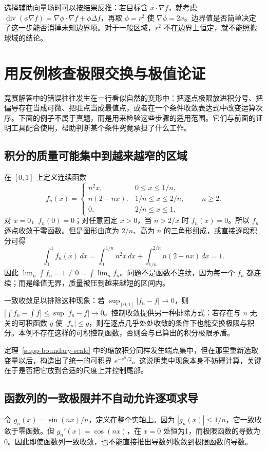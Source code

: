 \documentclass[UTF8,12pt,a4paper,fontset=fandol]{ctexart}
\begin{document}
选择辅助向量场时可以按结果反推：若目标含 $x\cdot\nabla f$，就考虑 $\operatorname{div}(\phi\nabla f)=\nabla\phi\cdot\nabla f+\phi\Delta f$，再取 $\phi=r^2$ 使 $\nabla\phi=2x$。边界值是否简单决定了这一步能否消掉未知边界项。对于一般区域，$r^2$ 不在边界上恒定，就不能照搬球域的结论。

\section{用反例核查极限交换与极值论证}\label{sec:supp-counterexamples}
竞赛解答中的错误往往发生在一行看似自然的变形中：把逐点极限放进积分号、把偏导存在当成可微、把驻点当成最值点，或者在一个条件收敛表达式中改变运算次序。下面的例子不属于真题，而是用来检验这些步骤的适用范围。它们与前面的证明工具配合使用，帮助判断某个条件究竟承担了什么工作。

\subsection{积分的质量可能集中到越来越窄的区域}
在 $[0,1]$ 上定义连续函数
\[
 f_n(x)=\begin{cases}
 n^2x,&0\leq x\leq1/n,\\
 n(2-nx),&1/n\leq x\leq2/n,\\
 0,&2/n\leq x\leq1,
 \end{cases}\qquad n\geq2.
\]
对 $x=0$，$f_n(0)=0$；对任意固定 $x>0$，当 $n>2/x$ 时 $f_n(x)=0$。所以 $f_n$ 逐点收敛于零函数。但是图形由底为 $2/n$、高为 $n$ 的三角形组成，或直接逐段积分可得
\[
 \int_0^1f_n(x)\,dx
 =\int_0^{1/n}n^2x\,dx+
   \int_{1/n}^{2/n}n(2-nx)\,dx=1.
\]
因此 $\lim_n\int f_n=1\ne0=\int\lim_nf_n$。问题不是函数不连续，因为每一个 $f_n$ 都连续；而是峰值无界，质量被压到越来越短的区间内。

一致收敛足以排除这种现象：若 $\sup_{[0,1]}|f_n-f|\to0$，则 $|\int f_n-\int f|\leq\sup|f_n-f|\to0$。控制收敛提供另一种排除方式：若存在与 $n$ 无关的可积函数 $g$ 使 $|f_n|\leq g$，则在逐点几乎处处收敛的条件下也能交换极限与积分。本例不存在这样的可积控制函数，否则会与已算出的积分极限矛盾。

定理~\ref{supp-boundary-scale} 中的缩放积分同样发生端点集中，但在那里重新选取变量以后，构造出了统一的可积界 $e^{-s^\alpha/2}$。这说明集中现象本身不妨碍计算，关键在于是否把它放到合适的尺度上并控制尾部。

\subsection{函数列的一致极限并不自动允许逐项求导}
令 $g_n(x)=\sin(nx)/n$，定义在整个实轴上。因为 $|g_n(x)|\leq1/n$，它一致收敛于零函数。但 $g_n'(x)=\cos(nx)$，在 $x=0$ 处恒为1，而极限函数的导数为0。因此即使函数列一致收敛，也不能直接推出导数列收敛到极限函数的导数。
\end{document}
